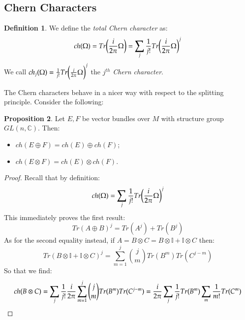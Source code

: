 \documentclass[12pt,a4paper]{report}
\theoremstyle{definition}
\newtheorem{Def}{Definition}[chapter]
\theoremstyle{Theorem}
\newtheorem{Prop}[Def]{Proposition}
\theoremstyle{break}
\theoremstyle{definition}
\begin{document}
	\subsection{Chern Characters}
	\begin{Def}
		We define the \textit{total Chern character} as:
		$$ch(\Omega)=Tr\bigg({i\over 2\pi}\Omega\bigg)=\sum_j {1\over j!}Tr\bigg({i\over 2\pi}\Omega\bigg)^j$$
		We call $ch_j(\Omega)={1\over j!}Tr\bigg({i\over 2\pi}\Omega\bigg)^j$ the $j^{th}$ \textit{Chern character}.
	\end{Def}
	The Chern characters behave in a nicer way with respect to the splitting principle. Consider the following:
	\begin{Prop}
		Let $E,F$ be vector bundles over $M$ with structure group $GL(n,\mathbb{C})$. Then:
		\begin{itemize}
			\item $ch(E\oplus F)=ch(E)\oplus ch(F)$;
			\item $ch(E\otimes F)=ch(E)\otimes ch(F)$.
		\end{itemize}
	\end{Prop}
	\begin{proof}
		Recall that by definition:
		$$ch(\Omega)=\sum_j {1\over j!}Tr\bigg({i\over 2\pi}\Omega\bigg)^j$$
		This immediately proves the first result:
		$$Tr(A\oplus B)^j=Tr(A^j)+Tr(B^j)$$
		As for the second equality instead, if $A=B\otimes C=B\otimes \mathbb{I}+\mathbb{I}\otimes C$ then:
		$$Tr(B\otimes \mathbb{I}+\mathbb{I}\otimes C)^j=\sum_{m=1}^j {j \choose m}Tr(B^m)Tr(C^{j-m})$$
		So that we find:
		$$ch(B\otimes C)=\sum_j {1\over j!}{i\over 2\pi}\sum_{m=1}^j {j \choose m}Tr(B^m)Tr(C^{j-m})={i\over 2\pi}\sum_j {1\over j!}Tr(B^m)\sum_{m}{1\over m!}Tr(C^{m})$$
	\end{proof}
\end{document}
